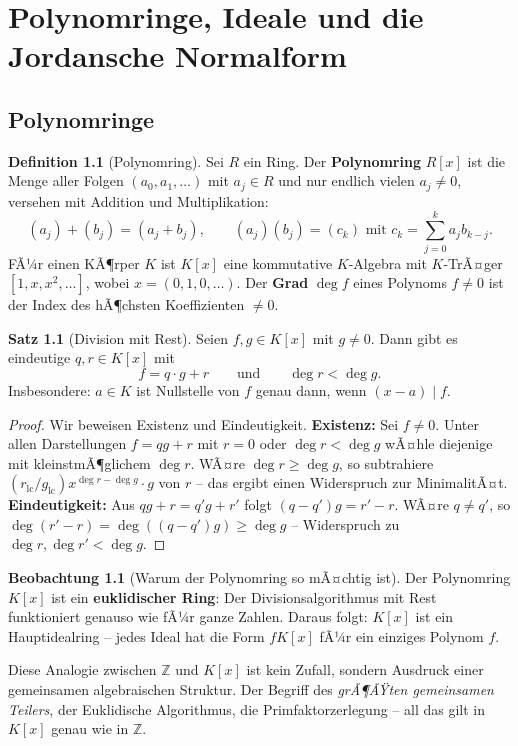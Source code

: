﻿\documentclass[a4paper,12pt]{report}
\theoremstyle{definition}
\newtheorem{definition}{Definition}
\newtheorem{satz}{Satz}
\newtheorem{beobachtung}{Beobachtung}
\begin{document}
\chapter{Polynomringe, Ideale und die Jordansche Normalform}

\section{Polynomringe}

\begin{definition}[Polynomring]
    Sei $R$ ein Ring. Der \textbf{Polynomring} $R[x]$ ist die Menge
    aller Folgen $(a_0, a_1, \dots)$ mit $a_j \in R$ und nur endlich
    vielen $a_j \neq 0$, versehen mit Addition und Multiplikation:
    \[
        (a_j) + (b_j) = (a_j + b_j), \qquad
        (a_j)(b_j) = (c_k) \text{ mit } c_k = \sum_{j=0}^k a_j b_{k-j}.
    \]
    FÃ¼r einen KÃ¶rper $K$ ist $K[x]$ eine kommutative $K$-Algebra
    mit $K$-TrÃ¤ger $[1, x, x^2, \dots]$, wobei $x = (0,1,0,\dots)$.
    Der \textbf{Grad} $\deg f$ eines Polynoms $f \neq 0$ ist der
    Index des hÃ¶chsten Koeffizienten $\neq 0$.
\end{definition}

\begin{satz}[Division mit Rest]
    Seien $f, g \in K[x]$ mit $g \neq 0$. Dann gibt es eindeutige
    $q, r \in K[x]$ mit
    \[
        f = q \cdot g + r \qquad \text{und} \qquad \deg r < \deg g.
    \]
    Insbesondere: $a \in K$ ist Nullstelle von $f$ genau dann, wenn
    $(x - a) \mid f$.
\end{satz}
\begin{proof}
    Wir beweisen Existenz und Eindeutigkeit.
    \textbf{Existenz:} Sei $f \neq 0$. Unter allen Darstellungen $f = qg + r$ mit
    $r = 0$ oder $\deg r < \deg g$ wÃ¤hle diejenige mit kleinstmÃ¶glichem $\deg r$.
    WÃ¤re $\deg r \geq \deg g$, so subtrahiere $(r_{\mathrm{lc}}/g_{\mathrm{lc}}) x^{\deg r - \deg g} \cdot g$
    von $r$ -- das ergibt einen Widerspruch zur MinimalitÃ¤t.
    \textbf{Eindeutigkeit:} Aus $qg + r = q'g + r'$ folgt $(q-q')g = r' - r$.
    WÃ¤re $q \neq q'$, so $\deg(r' - r) = \deg((q-q')g) \geq \deg g$ -- Widerspruch
    zu $\deg r, \deg r' < \deg g$.
\end{proof}


\begin{beobachtung}[Warum der Polynomring so mÃ¤chtig ist]
    Der Polynomring $K[x]$ ist ein \textbf{euklidischer Ring}: Der
    Divisionsalgorithmus mit Rest funktioniert genauso wie fÃ¼r ganze
    Zahlen. Daraus folgt: $K[x]$ ist ein Hauptidealring -- jedes
    Ideal hat die Form $f K[x]$ fÃ¼r ein einziges Polynom $f$.

    Diese Analogie zwischen $\mathbb{Z}$ und $K[x]$ ist kein Zufall,
    sondern Ausdruck einer gemeinsamen algebraischen Struktur. Der
    Begriff des \emph{grÃ¶ÃŸten gemeinsamen Teilers}, der Euklidische
    Algorithmus, die Primfaktorzerlegung -- all das gilt in $K[x]$
    genau wie in $\mathbb{Z}$.
\end{beobachtung}
\end{document}
